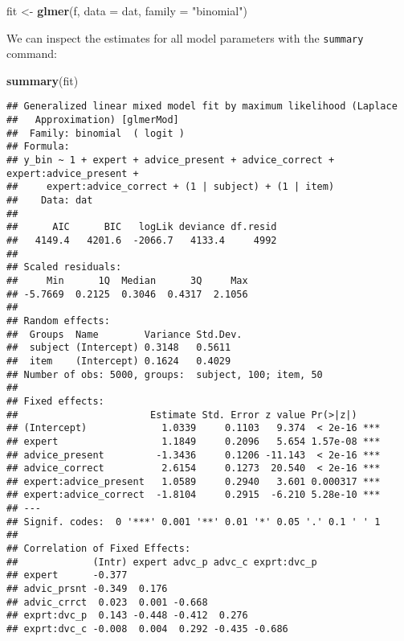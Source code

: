 \documentclass[
  man,floatsintext]{apa6}
\newenvironment{Shaded}{\begin{snugshade}}{\end{snugshade}}
\newcommand{\AttributeTok}[1]{\textcolor[rgb]{0.13,0.29,0.53}{#1}}
\newcommand{\FunctionTok}[1]{\textcolor[rgb]{0.13,0.29,0.53}{\textbf{#1}}}
\newcommand{\NormalTok}[1]{#1}
\newcommand{\OtherTok}[1]{\textcolor[rgb]{0.56,0.35,0.01}{#1}}
\newcommand{\StringTok}[1]{\textcolor[rgb]{0.31,0.60,0.02}{#1}}
\begin{document}
\begin{Shaded}
\begin{Highlighting}[]
\NormalTok{fit }\OtherTok{\textless{}{-}} \FunctionTok{glmer}\NormalTok{(f, }\AttributeTok{data =}\NormalTok{ dat, }\AttributeTok{family =} \StringTok{"binomial"}\NormalTok{)}
\end{Highlighting}
\end{Shaded}

We can inspect the estimates for all model parameters with the \texttt{summary} command:

\begin{Shaded}
\begin{Highlighting}[]
\FunctionTok{summary}\NormalTok{(fit)}
\end{Highlighting}
\end{Shaded}

\begin{verbatim}
## Generalized linear mixed model fit by maximum likelihood (Laplace
##   Approximation) [glmerMod]
##  Family: binomial  ( logit )
## Formula: 
## y_bin ~ 1 + expert + advice_present + advice_correct + expert:advice_present +  
##     expert:advice_correct + (1 | subject) + (1 | item)
##    Data: dat
## 
##      AIC      BIC   logLik deviance df.resid 
##   4149.4   4201.6  -2066.7   4133.4     4992 
## 
## Scaled residuals: 
##     Min      1Q  Median      3Q     Max 
## -5.7669  0.2125  0.3046  0.4317  2.1056 
## 
## Random effects:
##  Groups  Name        Variance Std.Dev.
##  subject (Intercept) 0.3148   0.5611  
##  item    (Intercept) 0.1624   0.4029  
## Number of obs: 5000, groups:  subject, 100; item, 50
## 
## Fixed effects:
##                       Estimate Std. Error z value Pr(>|z|)    
## (Intercept)             1.0339     0.1103   9.374  < 2e-16 ***
## expert                  1.1849     0.2096   5.654 1.57e-08 ***
## advice_present         -1.3436     0.1206 -11.143  < 2e-16 ***
## advice_correct          2.6154     0.1273  20.540  < 2e-16 ***
## expert:advice_present   1.0589     0.2940   3.601 0.000317 ***
## expert:advice_correct  -1.8104     0.2915  -6.210 5.28e-10 ***
## ---
## Signif. codes:  0 '***' 0.001 '**' 0.01 '*' 0.05 '.' 0.1 ' ' 1
## 
## Correlation of Fixed Effects:
##             (Intr) expert advc_p advc_c exprt:dvc_p
## expert      -0.377                                 
## advic_prsnt -0.349  0.176                          
## advic_crrct  0.023  0.001 -0.668                   
## exprt:dvc_p  0.143 -0.448 -0.412  0.276            
## exprt:dvc_c -0.008  0.004  0.292 -0.435 -0.686
\end{verbatim}
\end{document}

